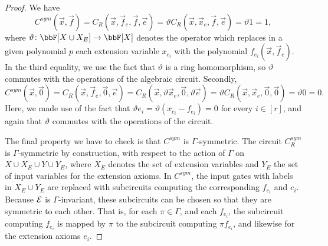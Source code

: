 \documentclass[10pt,a4paper]{article}
\renewcommand{\theta}{\vartheta}
\newcommand{\Ee}{{\cal E}}
\begin{document}
\begin{proof}
	We have
	\[
	C^{sym}(\vec x, \vec f) = C_R(\vec x, \vec f_e, \vec f, \vec e) = \theta C_R(\vec x, \vec x_e, \vec f, \vec e) = \theta 1 = 1,
	\]
	where $\theta \colon \bbF[X \cup X_E] \to \bbF[X]$ denotes the operator which replaces in a given polynomial $p$ each extension variable $x_{e_i}$ with the polynomial $f_{e_i}(\vec x, \vec f_e)$. In the third equality, we use the fact that $\theta$ is a ring homomorphism, so $\theta$ commutes with the operations of the algebraic circuit. Secondly, 
	\[
	C^{sym}(\vec x, \vec 0) =  C_R(\vec x, \vec f_e, \vec 0, \vec e) = C_R(\vec x, \theta \vec x_e, \vec 0, \theta \vec e) = \theta C_R(\vec x, \vec x_e, \vec 0, \vec 0)  = \theta 0 = 0.
	\]
	Here, we made use of the fact that $\theta e_i = \theta(x_{e_i} - f_{e_i}) = 0$ for every $i \in [r]$, and again that $\theta$ commutes with the operations of the circuit.
	
	The final property we have to check is that $C^{sym}$ is $\Gamma$-symmetric. The circuit $C^{sym}_R$ is $\Gamma$-symmetric by construction, with respect to the action of $\Gamma$ on $X \cup X_E \cup Y \cup Y_E$, where $X_E$ denotes the set of extension variables and $Y_E$ the set of input variables for the extension axioms. In $C^{sym}$, the input gates with labels in $X_E \cup Y_E$ are replaced with subcircuits computing the corresponding $f_{e_i}$ and $e_i$. Because $\Ee$ is $\Gamma$-invariant, these subcircuits can be chosen so that they are symmetric to each other. That is, for each $\pi \in \Gamma$, and each $f_{e_i}$, the subcircuit computing $f_{e_i}$ is mapped by $\pi$ to the subcircuit computing $\pi f_{e_i}$, and likewise for the extension axioms $e_i$. 
\end{proof}	
\end{document}
